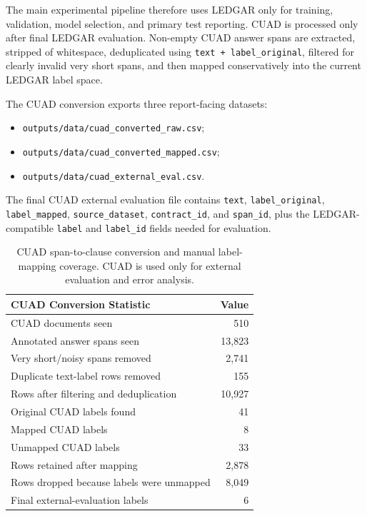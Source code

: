 \documentclass[11pt]{article}
\begin{document}
The main experimental pipeline therefore uses LEDGAR only for training, validation, model selection, and primary test reporting. CUAD is processed only after final LEDGAR evaluation. Non-empty CUAD answer spans are extracted, stripped of whitespace, deduplicated using \texttt{text + label\_original}, filtered for clearly invalid very short spans, and then mapped conservatively into the current LEDGAR label space.

The CUAD conversion exports three report-facing datasets:

\begin{itemize}[leftmargin=*]
    \item \texttt{outputs/data/cuad\_converted\_raw.csv};
    \item \texttt{outputs/data/cuad\_converted\_mapped.csv};
    \item \texttt{outputs/data/cuad\_external\_eval.csv}.
\end{itemize}

The final CUAD external evaluation file contains \texttt{text}, \texttt{label\_original}, \texttt{label\_mapped}, \texttt{source\_dataset}, \texttt{contract\_id}, and \texttt{span\_id}, plus the LEDGAR-compatible \texttt{label} and \texttt{label\_id} fields needed for evaluation.

\begin{table}[t]
\centering
\small
\begin{tabular}{lr}
\toprule
\textbf{CUAD Conversion Statistic} & \textbf{Value} \\
\midrule
CUAD documents seen & 510 \\
Annotated answer spans seen & 13,823 \\
Very short/noisy spans removed & 2,741 \\
Duplicate text-label rows removed & 155 \\
Rows after filtering and deduplication & 10,927 \\
Original CUAD labels found & 41 \\
Mapped CUAD labels & 8 \\
Unmapped CUAD labels & 33 \\
Rows retained after mapping & 2,878 \\
Rows dropped because labels were unmapped & 8,049 \\
Final external-evaluation labels & 6 \\
\bottomrule
\end{tabular}
\caption{CUAD span-to-clause conversion and manual label-mapping coverage. CUAD is used only for external evaluation and error analysis.}
\label{tab:cuad-conversion}
\end{table}
\end{document}
